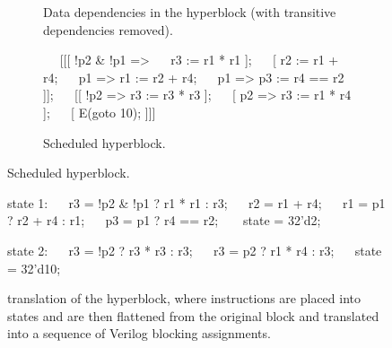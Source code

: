 \begin{figure*}
\begin{subfigure}{\linewidth}
\begin{subfigure}[b]{0.17\linewidth}
      \caption{Data dependencies in the \rtlblock{}
      hyperblock (with transitive dependencies removed). %
      }%
      \label{fig:op_chain_b}
    \end{subfigure}\hfill%
    \begin{subfigure}[b]{0.43\linewidth}
\begin{rtllisting}
~\sIII{}~ [[[ !p2 & !p1 =>
~\phantom{\sIII{}}~            r3 := r1 * r1 ];
~\sI{}~   [        r2 := r1 + r4;
~\sII{}~      p1 => r1 := r2 + r4;
~\sVI{}~      p1 => p3 := r4 == r2 ]];
~\sV{}~  [[ !p2 => r3 := r3 * r3 ];
~\sIV{}~   [  p2 => r3 := r1 * r4 ];
~\sVII{}~   [        E(goto 10); ]]]
\end{rtllisting}
      \caption{Scheduled \rtlpar{} hyperblock.}%
      \label{fig:op_chain_c}
    \end{subfigure}
  \end{subfigure}
  \begin{subfigure}{0.37\linewidth}
\begin{rtllisting}
state 1:
~\sIII{}~ r3 = !p2 & !p1 ? r1 * r1 : r3;
~\sI{}~ r2 = r1 + r4;
~\sII{}~ r1 = p1 ? r2 + r4 : r1;
~\sVI{}~ p3 = p1 ? r4 == r2;
~$\,\,$~  state = 32'd2;

state 2:
~\sV{}~ r3 = !p2 ? r3 * r3 : r3;
~\sIV{}~ r3 = p2 ? r1 * r4 : r3;
~\sVII{}~ state = 32'd10;
\end{rtllisting}
    \caption{\htl{} translation of the hyperblock, where instructions are placed
    into states and are then flattened from the original \rtlpar{} block and translated into a sequence of Verilog blocking assignments.}%
    \label{fig:htl-translation}
  \end{subfigure}\hfill%
    \begin{subfigure}[b]{0.61\linewidth}
      \centering
{}


\end{subfigure}
\end{figure*}
